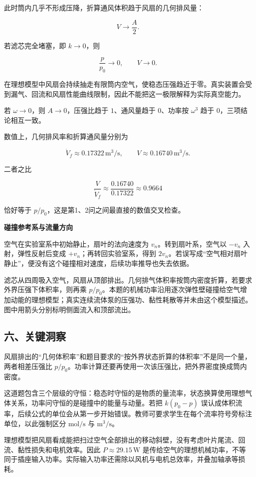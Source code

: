 \documentclass[12pt,a4paper,UTF8]{ctexart}
\begin{document}
此时筒内几乎不形成压降，折算通风体积趋于风扇的几何排风量：

\[
V\to\frac{A}{2}.
\]

若滤芯完全堵塞，即 \(k\to0\)，则

\[
\frac{p}{p_0}\to0,
\qquad
V\to0.
\]

在理想模型中风扇会持续抽走有限筒内空气，使稳态压强趋近于零。真实装置会受到漏气、回流和风扇性能曲线限制，因此不能把这一极限解释为实际真空能力。

若 \(\omega\to0\)，则 \(A\to0\)，压强比趋于 \(1\)、通风量趋于
\(0\)、功率按 \(\omega^3\) 趋于 \(0\)，三项结论相互一致。

数值上，几何排风率和折算通风量分别为

\[
\dot V_f\approx0.17322\,\mathrm{m^3/s},
\qquad
V\approx0.16740\,\mathrm{m^3/s}.
\]

二者之比

\[
\frac{V}{\dot V_f}
\approx\frac{0.16740}{0.17322}
\approx0.9664
\]

恰好等于 \(p/p_0\)，这是第1、2问之间最直接的数值交叉检查。

\textbf{碰撞参考系与流量方向}

空气在实验室系中初始静止，扇叶的法向速度为 \(v_n\)。转到扇叶系，空气以
\(-v_n\) 入射，弹性反射后变成 \(+v_n\)；再转回实验室系，得到
\(2v_n\)。若误写成``空气相对扇叶静止''，便没有这个碰撞相对速度，后续功率推导也失去依据。

滤芯从四周吸入空气，风扇从顶部排出。几何排气体积率按筒内密度折算，若要求外界压强下体积率，则再乘
\(p/p_0\)。本题的机械功率沿用逐次弹性壁碰撞给空气增加动能的理想模型；真实连续流体泵的压强功、黏性耗散等并未由这个模型描述。图中用箭头分别标明侧面流入和顶部流出。

\subsection{六、关键洞察}\label{ux516dux5173ux952eux6d1eux5bdf-7}

风扇排出的``几何体积率''和题目要求的``按外界状态折算的体积率''不是同一个量，两者相差压强比
\(p/p_0\)。功率计算还要再使用一次该压强比，把外界密度换成筒内密度。

这道题包含三个层级的守恒：稳态时守恒的是物质的量流率，状态换算使用理想气体关系，功率问守恒的是碰撞中的能量与动量。若把
\(k(p_0-p)\)
误认成体积流率，后续公式的单位会从第一步开始错误。教师可要求学生在每个流率符号旁标注单位，以此强制区分
\(\mathrm{mol/s}\) 与 \(\mathrm{m^3/s}\)。

理想模型把风扇看成能把扫过空气全部排出的移动斜壁，没有考虑叶片尾流、回流、黏性损失和电机效率。因此
\(P\approx29.15\,\mathrm W\)
是传给空气的理想机械功率，不等同于插座输入功率。实际输入功率还需除以风机与电机总效率，并叠加轴承等损耗。
\end{document}

